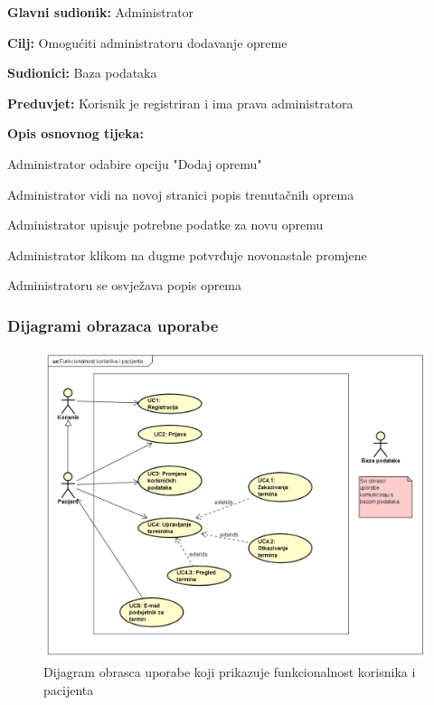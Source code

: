 \noindent {}
\begin{packed_item}
	
	\item \textbf{Glavni sudionik: }Administrator
	\item  \textbf{Cilj:} Omogućiti administratoru dodavanje opreme
	\item  \textbf{Sudionici:} Baza podataka
	\item  \textbf{Preduvjet:} Korisnik je registriran i ima prava administratora
	\item  \textbf{Opis osnovnog tijeka:}
	
	\item[] \begin{packed_enum}
		
		\item Administrator odabire opciju "Dodaj opremu"
		\item Administrator vidi na novoj stranici popis trenutačnih oprema
		\item Administrator upisuje potrebne podatke za novu opremu
		\item Administrator klikom na dugme potvrđuje novonastale promjene
		\item Administratoru se osvježava popis oprema
	\end{packed_enum}
	
\end{packed_item}



\subsubsection{Dijagrami obrazaca uporabe}

\begin{figure}[H]
	\includegraphics[scale=0.6]{slike/KorisnikIPacijent.PNG} %
	\centering
	\caption{Dijagram obrasca uporabe koji prikazuje funkcionalnost korisnika i pacijenta}
	\label{fig:promjene}
\end{figure}

